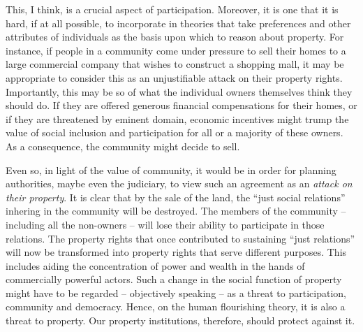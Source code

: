 This, I think, is a crucial aspect of participation. Moreover, it is one that it is hard, if at all possible, to incorporate in theories that take preferences and other attributes of individuals as the basis upon which to reason about property. For instance, if people in a community come under pressure to sell their homes to a large commercial company that wishes to construct a shopping mall, it may be appropriate to consider this as an unjustifiable attack on their property rights. Importantly, this may be so  of what the individual owners themselves think they should do. If they are offered generous financial compensations for their homes, or if they are threatened by eminent domain, economic incentives might trump the value of social inclusion and participation for all or a majority of these owners. As a consequence, the community might decide to sell.  

Even so, in light of the value of community, it would be in order for planning authorities, maybe even the judiciary, to view such an agreement as an {\it attack on their property}. It is clear that by the sale of the land, the ``just social relations'' inhering in the community will be destroyed. The members of the community -- including all the non-owners -- will lose their ability to participate in those relations. The property rights that once contributed to sustaining ``just relations'' will now be transformed into property rights that serve different purposes. This includes aiding the concentration of power and wealth in the hands of commercially powerful actors. Such a change in the social function of property might have to be regarded -- objectively speaking -- as a threat to participation, community and democracy. Hence, on the human flourishing theory, it is also a threat to property. Our property institutions, therefore, should protect against it.

